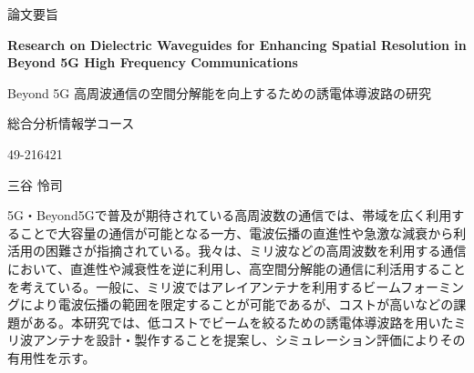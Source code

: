 \documentclass[a4paper,12pt]{report}
\begin{document}
\thispagestyle{plain}
\begin{center}
    \Large
    \begin{CJK}{UTF8}{ipxm}論文要旨\end{CJK}

    \vspace{2.0cm}

    \Large
    \textbf{Research on Dielectric Waveguides for Enhancing Spatial Resolution in Beyond 5G High Frequency Communications}

    \vspace{0.4cm}
    \begin{CJK}{UTF8}{ipxm}Beyond 5G 高周波通信の空間分解能を向上するための誘電体導波路の研究\end{CJK}
        
    \vspace{0.4cm}
    \large

    \vspace{0.4cm}
    \begin{CJK}{UTF8}{ipxm}総合分析情報学コース\end{CJK}

    \vspace{0.4cm}
    \begin{CJK}{UTF8}{ipxm}49-216421\end{CJK}

    \vspace{0.4cm}
    \begin{CJK}{UTF8}{ipxm}三谷 怜司\end{CJK}
       
    \vspace{0.9cm}
\end{center}

\begin{CJK}{UTF8}{ipxm}
5G・Beyond5Gで普及が期待されている高周波数の通信では、帯域を広く利用することで大容量の通信が可能となる一方、電波伝播の直進性や急激な減衰から利活用の困難さが指摘されている。我々は、ミリ波などの高周波数を利用する通信において、直進性や減衰性を逆に利用し、高空間分解能の通信に利活用することを考えている。一般に、ミリ波ではアレイアンテナを利用するビームフォーミングにより電波伝播の範囲を限定することが可能であるが、コストが高いなどの課題がある。本研究では、低コストでビームを絞るための誘電体導波路を用いたミリ波アンテナを設計・製作することを提案し、シミュレーション評価によりその有用性を示す。
\end{CJK}

\vspace{1.0cm}
\end{document}

